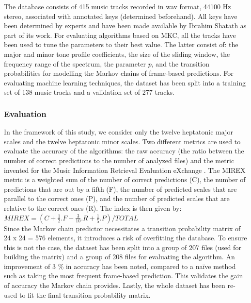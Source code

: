 \documentclass[letterpaper]{article}
\begin{document}
The database consists of 415 music tracks recorded in wav format, 44100 Hz stereo, associated with annotated keys (determined beforehand).
All keys have been determined
by experts and have been made available by Ibrahim Shat\textquotesingle ath as part of its work. For evaluating algorithms based on MKC,
all the tracks have been used to tune the parameters to their best value. The latter consist of: the major and minor tone profile coefficients,
the size of the sliding window, the frequency range of the spectrum, the parameter $p$, and the transition probabilities for modelling the Markov chains of frame-based predictions. For evaluating machine learning techniques,
the dataset has been split into a training set of 138 music tracks and a validation set of 277 tracks.

\subsubsection{Evaluation}

In the framework of this study, we consider only the twelve heptatonic major scales and the twelve heptatonic minor scales.
Two different metrics are used to evaluate the accuracy of the algorithms:
the raw accuracy (the ratio between the number of correct predictions to the number of analyzed files) and the metric invented for the Music Information Retrieval Evaluation eXchange \citep{MIREX}.
The MIREX metric is a weighted sum of the number of correct predictions (C), the number of predictions that are out by a fifth (F), the number of predicted scales that are parallel to the correct ones (P), and the number of predicted scales
that are relative to the correct ones (R). The index is then given by: \\

\noindent $ MIREX = (C + \frac{1}{2}.F + \frac{3}{10}.R + \frac{1}{5}.P) / TOTAL $ \\

Since the Markov chain predictor necessitates a transition probability matrix of 24 x 24 = 576 elements, it introduces a risk of overfitting the database. To ensure this is not the case, the dataset has been split into a group of 207 files (used for building the matrix) and a group of 208 files for evaluating the algorithm. An improvement of 3 \% in accuracy has been noted, compared to a naïve method such as taking the most frequent frame-based prediction. This validates the gain of accuracy the Markov chain provides. Lastly, the whole dataset has been re-used to fit the final transition probability matrix.
\end{document}

